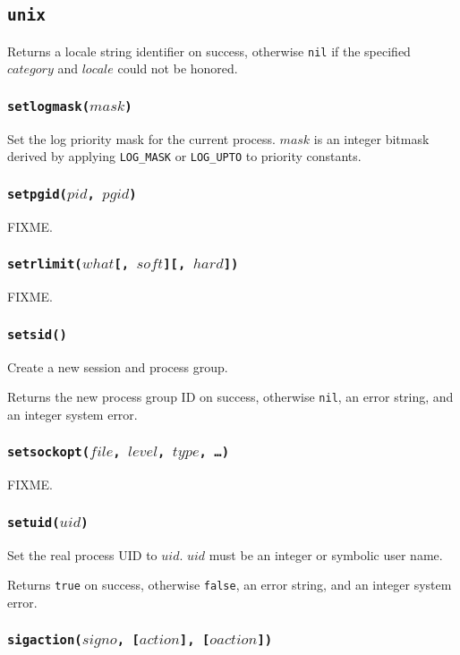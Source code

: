\documentclass[11pt, oneside]{memoir}
\newcommand*{\true}[0]{\texttt{true}\xspace}
\newcommand*{\false}[0]{\texttt{false}\xspace}
\newcommand*{\nil}[0]{\texttt{nil}\xspace}
\newcommand*{\fn}[1]{\texttt{#1}\xspace}
\newcounter{toccols}
\newenvironment{Module}[1]{
	\subsection{\texttt{#1}}
	\addtocontents{toc}{
		\protect\begin{multicols}{\value{toccols}}
	}
}{
	\addtocontents{toc}{\protect\end{multicols}}
}
\begin{document}
\begin{Module}{unix}
Returns a locale string identifier on success, otherwise \nil if the specified $category$ and $locale$ could not be honored.

\subsubsection[\fn{setlogmask}]{\fn{setlogmask($mask$)}}

Set the log priority mask for the current process. $mask$ is an integer bitmask derived by applying \fn{LOG\_MASK} or \fn{LOG\_UPTO} to priority constants.

\subsubsection[\fn{setpgid}]{\fn{setpgid($pid$, $pgid$)}}

FIXME.

\subsubsection[\fn{setrlimit}]{\fn{setrlimit($what$[, $soft$][, $hard$])}}

FIXME.

\subsubsection[\fn{setsid}]{\fn{setsid()}}

Create a new session and process group.

Returns the new process group ID on success, otherwise \nil, an error string, and an integer system error.

\subsubsection[\fn{setsockopt}]{\fn{setsockopt($file$, $level$, $type$, \ldots)}}

FIXME.

\subsubsection[\fn{setuid}]{\fn{setuid($uid$)}}

Set the real process UID to $uid$. $uid$ must be an integer or symbolic user name.

Returns \true on success, otherwise \false, an error string, and an integer system error.

\subsubsection[\fn{sigaction}]{\fn{sigaction($signo$, [$action$], [$oaction$])}}


\end{Module}
\end{document}
